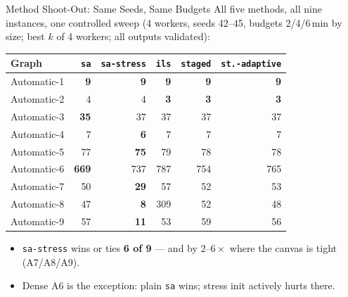 \begin{frame}{Method Shoot-Out: Same Seeds, Same Budgets}
  All five methods, all nine instances, one controlled sweep
  (4 workers, seeds 42--45, budgets 2/4/6\,min by size; best $k$ of 4 workers; all outputs validated):
  \begin{center}
    \footnotesize
    \begin{tabular}{lrrrrr}
      \toprule
      \textbf{Graph} & \texttt{sa} & \texttt{sa-stress} & \texttt{ils} & \texttt{staged} & \texttt{st.-adaptive} \\
      \midrule
      Automatic-1 & \textbf{9}  & \textbf{9}  & \textbf{9}  & \textbf{9}  & \textbf{9}  \\
      Automatic-2 & 4           & 4           & \textbf{3}  & \textbf{3}  & \textbf{3}  \\
      Automatic-3 & \textbf{35} & 37          & 37          & 37          & 37          \\
      Automatic-4 & 7           & \textbf{6}  & 7           & 7           & 7           \\
      Automatic-5 & 77          & \textbf{75} & 79          & 78          & 78          \\
      Automatic-6 & \textbf{669}& 737         & 787         & 754         & 765         \\
      Automatic-7 & 50          & \textbf{29} & 57          & 52          & 53          \\
      Automatic-8 & 47          & \textbf{8}  & 309         & 52          & 48          \\
      Automatic-9 & 57          & \textbf{11} & 53          & 59          & 56          \\
      \bottomrule
    \end{tabular}
  \end{center}
  \smallskip
  \begin{itemize}
    \item \texttt{sa-stress} wins or ties \textbf{6 of 9} --- and by $2$--$6\times$ where
          the canvas is tight (A7/A8/A9).
    \item Dense A6 is the exception: plain \texttt{sa} wins; stress init actively hurts there.
  \end{itemize}
\end{frame}
